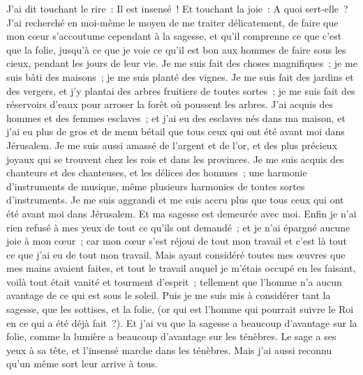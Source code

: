 \begin{multicols}{2}
J'ai dit touchant le rire~: Il est insensé~! Et touchant la joie~: A quoi sert-elle~?
J'ai recherché en moi-même le moyen de me traiter délicatement, de faire que mon cœur s'accoutume cependant à la sagesse, et qu'il comprenne ce que c'est que la folie, jusqu'à ce que je voie ce qu'il est bon aux hommes de faire sous les cieux, pendant les jours de leur vie. 
Je me suis fait des choses magnifiques~; je me suis bâti des maisons~; je me suis planté des vignes.
Je me suis fait des jardins et des vergers, et j'y plantai des arbres fruitiers de toutes sortes~;
je me suis fait des réservoirs d'eaux pour arroser la forêt où poussent les arbres.
J'ai acquis des hommes et des femmes esclaves~; et j'ai eu des esclaves nés dans ma maison, et j'ai eu plus de gros et de menu bétail que tous ceux qui ont été avant moi dans Jérusalem. 
Je me suis aussi amassé de l'argent et de l'or, et des plus précieux joyaux qui se trouvent chez les rois et dans les provinces. Je me suis acquis des chanteurs et des chanteuses, et les délices des hommes~; une harmonie d'instruments de musique, même plusieurs harmonies de toutes sortes d'instruments. 
Je me suis aggrandi et me suis accru plus que tous ceux qui ont été avant moi dans Jérusalem. Et ma sagesse est demeurée avec moi.
Enfin je n'ai rien refusé à mes yeux de tout ce qu'ils ont demandé~; et je n'ai épargné aucune joie à mon cœur~; car mon cœur s'est réjoui de tout mon travail et c'est là tout ce que j'ai eu de tout mon travail.
Mais ayant considéré toutes mes œuvres que mes mains avaient faites, et tout le travail auquel je m'étais occupé en les faisant, voilà tout était vanité et tourment d'esprit~; tellement que l'homme n'a aucun avantage de ce qui est sous le soleil.
Puis je me suis mis à considérer tant la sagesse, que les sottises, et la folie, (or qui est l'homme qui pourrait suivre le Roi en ce qui a été déjà fait~?).
Et j'ai vu que la sagesse a beaucoup d'avantage sur la folie, comme la lumière a beaucoup d'avantage sur les ténèbres.
Le sage a ses yeux à sa tête, et l'insensé marche dans les ténèbres. Mais j'ai aussi reconnu qu'un même sort leur arrive à tous.

\end{multicols}
